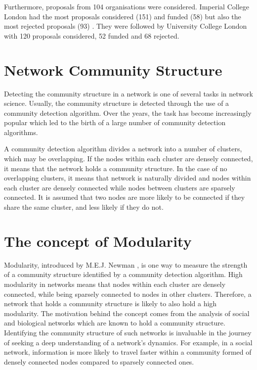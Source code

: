 Furthermore, proposals from 104 organisations were considered. Imperial College London had the most proposals considered (151) and funded (58) but also the most rejected proposals (93) \cite{epsrc_funding_rates_1415}. They were followed by University College London with 120 proposals considered, 52 funded and 68 rejected.
\fi

\section{Network Community Structure}

Detecting the community structure in a network is one of several tasks in network science. Usually, the community structure is detected through the use of a community detection algorithm. Over the years, the task has become increasingly popular which led to the birth of a large number of community detection algorithms.

A community detection algorithm divides a network into a number of clusters, which may be overlapping. If the nodes within each cluster are densely connected, it means that the network holds a community structure. In the case of no overlapping clusters, it means that network is naturally divided and nodes within each cluster are densely connected while nodes between clusters are sparsely connected. It is assumed that two nodes are more likely to be connected if they share the same cluster, and less likely if they do not.

\section{The concept of Modularity}

Modularity, introduced by M.E.J. Newman \cite{newman2006modularity}, is one way to measure the strength of a community structure identified by a community detection algorithm. High modularity in networks means that nodes within each cluster are densely connected, while being sparsely connected to nodes in other clusters. Therefore, a network that holds a community structure is likely to also hold a high modularity. The motivation behind the concept comes from the analysis of social and biological networks which are known to hold a community structure. Identifying the community structure of such networks is invaluable in the journey of seeking a deep understanding of a network's dynamics. For example, in a social network, information is more likely to travel faster within a community formed of densely connected nodes compared to sparsely connected ones.

